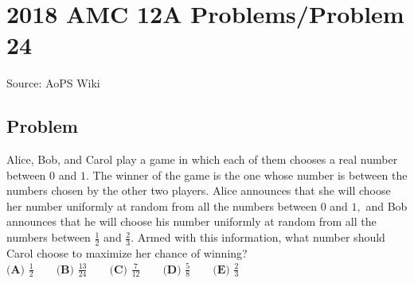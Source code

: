 \documentclass[12pt]{article}
\begin{document}
\section*{{2018 AMC 12A Problems/Problem 24}}
Source: AoPS Wiki

\subsection*{Problem}
Alice, Bob, and Carol play a game in which each of them chooses a real number between $0$ and $1.$ The winner of the game is the one whose number is between the numbers chosen by the other two players. Alice announces that she will choose her number uniformly at random from all the numbers between $0$ and $1,$ and Bob announces that he will choose his number uniformly at random from all the numbers between $\tfrac{1}{2}$ and $\tfrac{2}{3}.$ Armed with this information, what number should Carol choose to maximize her chance of winning? $\textbf{(A) }\frac{1}{2}\qquad \textbf{(B) }\frac{13}{24} \qquad \textbf{(C) }\frac{7}{12} \qquad \textbf{(D) }\frac{5}{8} \qquad \textbf{(E) }\frac{2}{3}\qquad$
\end{document}
